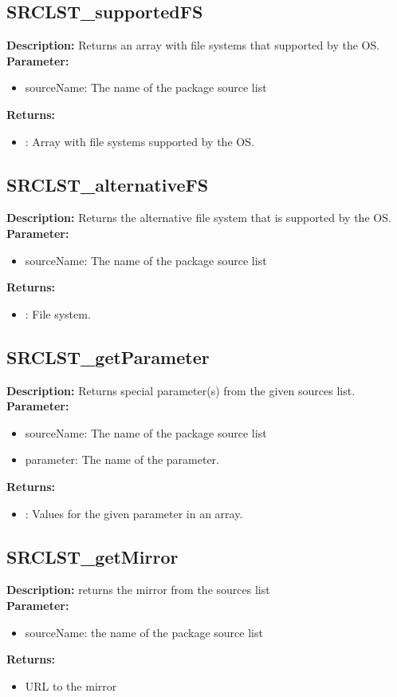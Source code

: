 \subsection{SRCLST\_supportedFS}
\textbf{Description:} Returns an array with file systems that supported by the OS.\\
\textbf{Parameter:}
\begin{itemize}
\item sourceName: The name of the package source list
\end{itemize}
\textbf{Returns:}
\begin{itemize}
\item : Array with file systems supported by the OS.
\end{itemize}

\subsection{SRCLST\_alternativeFS}
\textbf{Description:} Returns the alternative file system that is supported by the OS.\\
\textbf{Parameter:}
\begin{itemize}
\item sourceName: The name of the package source list
\end{itemize}
\textbf{Returns:}
\begin{itemize}
\item : File system.
\end{itemize}

\subsection{SRCLST\_getParameter}
\textbf{Description:} Returns special parameter(s) from the given sources list.\\
\textbf{Parameter:}
\begin{itemize}
\item sourceName: The name of the package source list
\item parameter: The name of the parameter.
\end{itemize}
\textbf{Returns:}
\begin{itemize}
\item : Values for the given parameter in an array.
\end{itemize}

\subsection{SRCLST\_getMirror}
\textbf{Description:} returns the mirror from the sources list\\
\textbf{Parameter:}
\begin{itemize}
\item sourceName: the name of the package source list
\end{itemize}
\textbf{Returns:}
\begin{itemize}
\item URL to the mirror
\end{itemize}

